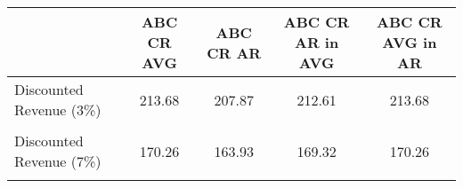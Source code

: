 \begin{tabular}{l*{4}{c}}
\hline\hline
                &ABC CR AVG&ABC CR AR&ABC CR AR in AVG&ABC CR AVG in AR\\
\hline
Discounted Revenue (3\%)&   213.68&   207.87&   212.61&   213.68\\
                &         &         &         &         \\
Discounted Revenue (7\%)&   170.26&   163.93&   169.32&   170.26\\
                &         &         &         &         \\
\hline\hline
\end{tabular}
